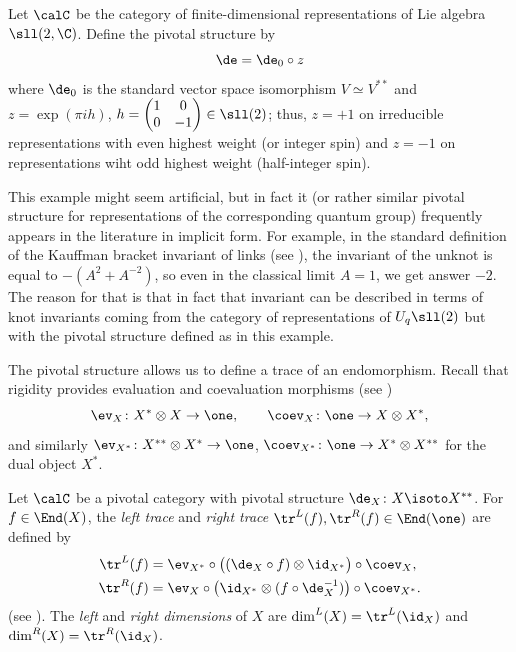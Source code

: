\begin{example}\label{x:sl2-pivotal}
  Let $\calC$ be the category of finite-dimensional representations of Lie
  algebra $\sll(2,\C)$. Define the pivotal structure by
  $$
    \de=\de_0\circ z
  $$
  where $\de_0$ is the standard vector space isomorphism $V\simeq V^{**}$ and
  $z=\exp(\pi i h)$, $h=\begin{pmatrix} 1 & 0\\ 0 &-1\end{pmatrix}\in \sll(2)$;
  thus, $z=+1$ on irreducible representations with even highest weight (or
  integer spin)  and $z=-1$ on representations wiht odd highest weight
  (half-integer spin).

  This example might seem artificial, but in fact it (or rather similar pivotal
  structure for representations of the corresponding quantum group) frequently
  appears in the literature in implicit form. For example, in the standard
  definition of the Kauffman bracket invariant of links (see \cite{kauffman}),
  the invariant of the unknot is equal to $-(A^2+A^{-2})$, so even in the
  classical limit $A=1$, we get answer $-2$. The reason for that is that in
  fact that invariant can be described in terms of knot invariants coming from
  the category of representations of $U_q\sll(2)$ but with the pivotal
  structure defined as in this example.
\end{example}

The pivotal structure allows us to define a trace of an endomorphism. Recall
that rigidity provides evaluation and coevaluation morphisms (see
)
$$
  \ev_X\colon X^*\otimes X\to \one,\qquad \coev_X\colon \one\to X\otimes X^*,
$$
and similarly $\ev_{X^*}\colon X^{**}\otimes X^*\to \one$,
$\coev_{X^*}\colon \one\to X^*\otimes X^{**}$ for the dual object $X^*$.

\begin{definition}\label{d:traces}
  Let $\calC$ be a pivotal category with pivotal structure $\de_X\colon X\isoto
  X^{**}$. For $f\in \End(X)$, the \emph{left trace} and \emph{right
  trace}
  $\tr^L(f),\tr^R(f)\in \End(\one)$ are defined by
  \begin{align*}
    \tr^L(f) &= \ev_{X^*}\circ\bigl((\de_X\circ f)\otimes \id_{X^*}\bigr)\circ
                \coev_X,\\
    \tr^R(f) &= \ev_X\circ\bigl(\id_{X^*}\otimes (f\circ\de_X^{-1})\bigr)\circ
                \coev_{X^*}.
  \end{align*}
  (see ).
  The \emph{left} and \emph{right dimensions} of $X$ are
  $\dim^L(X)=\tr^L(\id_X)$ and $\dim^R(X)=\tr^R(\id_X)$.
\end{definition}

